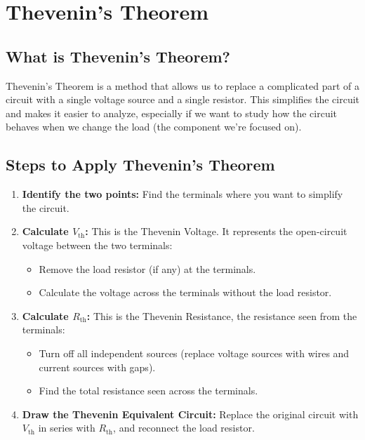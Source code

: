 \documentclass{article}
\begin{document}
\newpage
\section{Thevenin's Theorem}

\subsection{What is Thevenin's Theorem?}
Thevenin's Theorem is a method that allows us to replace a complicated part of a circuit with a single voltage source and a single resistor. This simplifies the circuit and makes it easier to analyze, especially if we want to study how the circuit behaves when we change the load (the component we’re focused on).

\subsection{Steps to Apply Thevenin's Theorem}
\begin{enumerate}
    \item \textbf{Identify the two points:} Find the terminals where you want to simplify the circuit.
    \item \textbf{Calculate \( V_{\text{th}} \):} This is the Thevenin Voltage. It represents the open-circuit voltage between the two terminals:
    \begin{itemize}
        \item Remove the load resistor (if any) at the terminals.
        \item Calculate the voltage across the terminals without the load resistor.
    \end{itemize}
    \item \textbf{Calculate \( R_{\text{th}} \):} This is the Thevenin Resistance, the resistance seen from the terminals:
    \begin{itemize}
        \item Turn off all independent sources (replace voltage sources with wires and current sources with gaps).
        \item Find the total resistance seen across the terminals.
    \end{itemize}
    \item \textbf{Draw the Thevenin Equivalent Circuit:} Replace the original circuit with \( V_{\text{th}} \) in series with \( R_{\text{th}} \), and reconnect the load resistor.
\end{enumerate}
\end{document}
